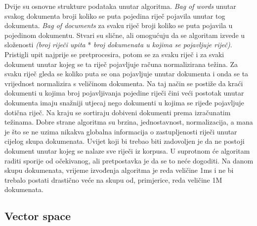 \documentclass[a4paper,12pt]{article}
\begin{document}
Dvije su osnovne strukture podataka unutar algoritma. \textit{Bag of words} unutar svakog dokumenta broji koliko se puta pojedina riječ pojavila unutar tog dokumenta. \textit{Bag of documents} za svaku riječ broji koliko se puta pojavila u pojedinom dokumentu. Stvari su slične, ali omogućuju da se algoritam izvede u složenosti \textit{(broj riječi upita} * \textit{broj dokumenata u kojima se pojavljuje riječ)}. Pristigli upit najprije se pretprocesira, potom se za svaku riječ i za svaki dokument unutar kojeg se ta riječ pojavljuje računa normalizirana težina. Za svaku riječ  gleda se koliko puta se ona pojavljuje unutar dokumenta i onda se ta vrijednost normalizira s veličinom dokumenta. Na taj način se postiže da kraći dokumenti u kojima broj pojavljivanja pojedine riječi čini veći postotak unutar dokumenta imaju snažniji utjecaj nego dokumenti u kojima se rijeđe pojavljuje dotična riječ. Na kraju se sortiraju dobiveni dokumenti prema izračunatim težinama. Dobre strane algoritma su brzina, jednostavnost, normalizacija, a mana je što se ne uzima nikakva globalna informacija o zastupljenosti riječi unutar cijelog skupa dokumenata. Uvijet koji bi trebao biti zadovoljen je da ne postoji dokument unutar kojeg se nalaze sve riječi iz korpusa. U suprotnom će algoritam raditi sporije od očekivanog, ali pretpostavka je da se to neće dogoditi. Na danom skupu dokumenata, vrijeme izvođenja algoritma je reda veličine 1ms i ne bi trebalo postati drastično veće na skupu od, primjerice, reda veličine 1M dokumenata.

\subsection{Vector space}
\end{document}
